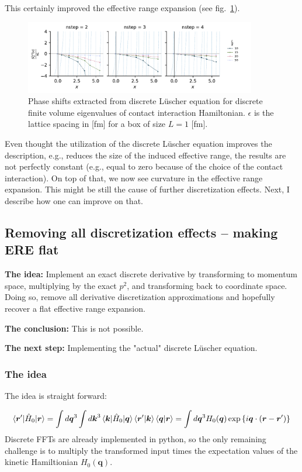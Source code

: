 \documentclass[
    aps,
    prl,
    showkeys,
    nofootinbib,
    floatfix
]{revtex4-1}
\renewcommand{\vec}[1]{\boldsymbol{#1}}
\begin{document}
This certainly improved the effective range expansion (see fig.~\ref{fig-cont-lusch}).
\begin{figure}[!htb]
\includegraphics[width=0.9\textwidth]{figs/eff-range-discrete-lusch.pdf}
\caption{
    \label{fig-cont-lusch}Phase shifts extracted from discrete Lüscher equation for discrete finite volume eigenvalues of contact interaction Hamiltonian.
    $\epsilon$ is the lattice spacing in [fm] for a box of size $L = 1$ [fm].
 }
\end{figure}

Even thought the utilization of the discrete Lüscher equation improves the description, e.g., reduces the size of the induced effective range, the results are not perfectly constant (e.g., equal to zero because of the choice of the contact interaction).
On top of that, we now see curvature in the effective range expansion.
This might be still the cause of further discretization effects.
Next, I describe how one can improve on that.

\subsection{Removing all discretization effects -- making ERE flat}
\textbf{The idea:} Implement an exact discrete derivative by transforming to momentum space, multiplying by the exact $p^2$, and transforming back to coordinate space.
Doing so, remove all derivative discretization approximations and hopefully recover a flat effective range expansion.

\textbf{The conclusion:} This is not possible.

\textbf{The next step:} Implementing the "actual" discrete Lüscher equation.

\subsubsection{The idea}
The idea is straight forward:

\begin{equation}
	\braket{ \vec r ' | \hat H_0 | \vec r}
	=
	\int d \vec q^3 \int d \vec k^3 \braket{ \vec k | \hat H_0 | \vec q} \braket{\vec r' | \vec k} \braket{\vec q | \vec r}
	=
	\int d \vec q^3 H_0(\vec q) \exp\left\{ i \vec q \cdot \left( \vec r - \vec r '\right)\right\}
\end{equation}
Discrete FFTs are already implemented in python, so the only remaining challenge is to multiply the transformed input times the expectation values of the kinetic Hamiltionian $H_0(\vec q)$.
\end{document}
